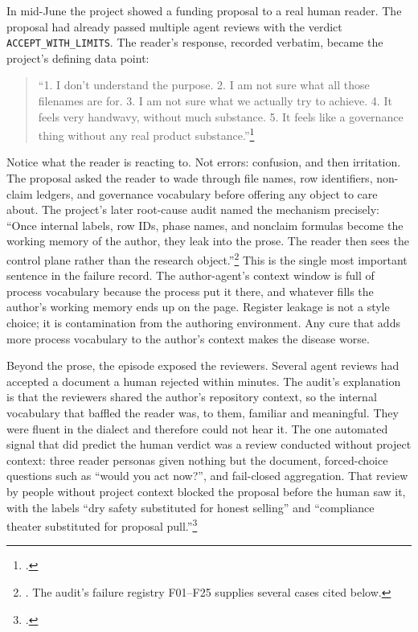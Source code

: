 In mid-June the project showed a funding proposal to a real human reader. The
proposal had already passed multiple agent reviews with the verdict
\texttt{ACCEPT\_WITH\_LIMITS}. The reader's response, recorded verbatim,
became the project's defining data point:

\begin{quote}\small
``1. I don't understand the purpose. 2. I am not sure what all those
filenames are for. 3. I am not sure what we actually try to achieve. 4. It
feels very handwavy, without much substance. 5. It feels like a governance
thing without any real product substance.''\footnote{.}
\end{quote}

Notice what the reader is reacting to. Not errors: confusion, and then
irritation. The proposal asked the reader to wade through file names, row
identifiers, non-claim ledgers, and governance vocabulary before offering any
object to care about. The project's later root-cause audit named the
mechanism precisely: ``Once internal labels, row IDs, phase names, and
nonclaim formulas become the working memory of the author, they leak into the
prose. The reader then sees the control plane rather than the research
object.''\footnote{. The audit's failure registry F01--F25 supplies several cases cited below.}
This is the single most important sentence in the failure record. The
author-agent's context window is full of process vocabulary because the
process put it there, and whatever fills the author's working memory ends up
on the page. Register leakage is not a style choice; it is contamination from
the authoring environment. Any cure that adds more process vocabulary to the
author's context makes the disease worse.

Beyond the prose, the episode exposed the reviewers. Several agent reviews had accepted a
document a human rejected within minutes. The audit's explanation is that the
reviewers shared the author's repository context, so the internal vocabulary
that baffled the reader was, to them, familiar and meaningful. They were
fluent in the dialect and therefore could not hear it. The one automated
signal that did predict the human verdict was a review conducted without
project context: three reader personas given nothing but the document,
forced-choice questions such as ``would you act now?'', and fail-closed
aggregation. That review by people without project context blocked the proposal before the
human saw it, with the labels ``dry safety substituted for honest selling''
and ``compliance theater substituted for proposal
pull.''\footnote{.}

